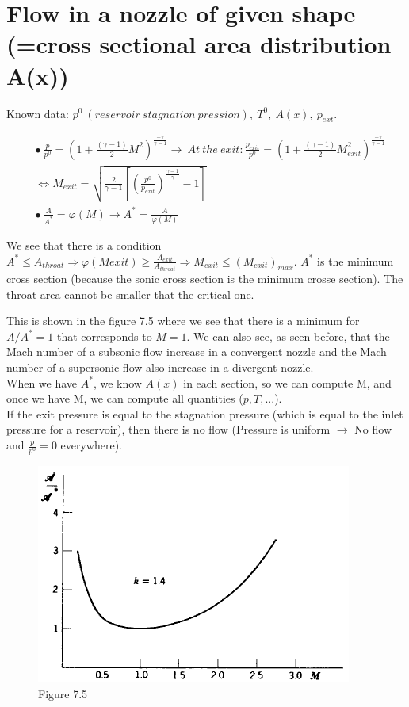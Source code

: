 \section{Flow in a nozzle of given shape (=cross sectional area distribution A(x))}

Known data: $p^0\ (reservoir\ stagnation\ pression),\ T^0,\ A(x), \ p_{ext}$.

 \begin{equation}
\begin{aligned}
&\bullet\  \frac{p}{p^0}=(1+\frac{(\gamma-1) }{2}M^2)^{\frac{-\gamma}{\gamma-1}} \rightarrow \ At\ the\ exit: 
\frac{p_{exit}}{p^0}=(1+\frac{(\gamma-1) }{2}M^2_{exit})^{\frac{-\gamma}{\gamma-1}} \\ 
& \Leftrightarrow M_{exit}=\sqrt{\frac{2}{\gamma-1}[(\frac{p^0}{p_{exit}})^{\frac{\gamma-1}{\gamma}}-1]} \\
&\bullet\ \frac{A}{A^*}=\varphi(M) \rightarrow A^*=\frac{A}{\varphi(M)}
\end{aligned} 
\end{equation}

We see that there is a condition $A^* \leq A_{throat} \Rightarrow \varphi(M{exit}) \geq \frac{A_{exit}}{A_{throat}} \Rightarrow M_{exit}\leq (M_{exit})_{max}$. $A^*$ is the minimum cross section (because the sonic cross section is the minimum crosse section). The throat area cannot be smaller that the critical one. 

This is shown in the figure 7.5 where we see that there is a minimum for $A/A^*=1$ that corresponds to $M=1$. We can also see, as seen before, that the Mach number of a subsonic flow increase in a convergent nozzle and the Mach number of a supersonic flow also increase in a divergent nozzle.
\\

When we have $A^*$, we know $A(x)$ in each section, so we can compute M, and once we have M, we can compute all quantities ($p, T,...$).
\\

If the exit pressure is equal to the stagnation pressure (which is equal to the inlet pressure for a reservoir), then there is no flow (Pressure is uniform $\rightarrow$ No flow and $\frac{p}{p^0}=0$ everywhere).

\begin{figure}[H]
\begin{center}
\includegraphics[scale=0.30]{ch7/chap75.png}
\caption*{Figure 7.5}
\end{center}
\end{figure}

